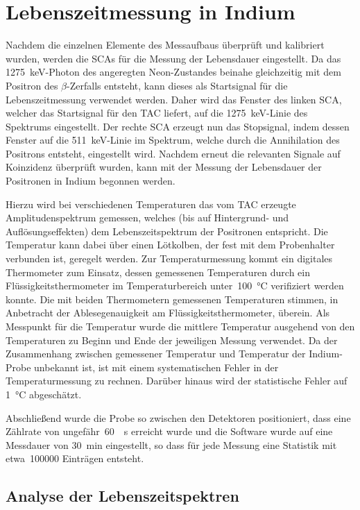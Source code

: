 \documentclass[11pt, a4paper]{article}
\numberwithin{equation}{section}
\begin{document}
\section{Lebenszeitmessung in Indium}
Nachdem die einzelnen Elemente des Messaufbaus überprüft und kalibriert wurden, werden die SCAs für die Messung der Lebensdauer eingestellt.
Da das \SI{1275}{\keV}-Photon des angeregten Neon-Zustandes beinahe gleichzeitig mit dem Positron des $\beta$-Zerfalls entsteht, kann dieses als Startsignal für die Lebenszeitmessung verwendet werden.
Daher wird das Fenster des linken SCA, welcher das Startsignal für den TAC liefert, auf die \SI{1275}{\keV}-Linie des Spektrums eingestellt.
Der rechte SCA erzeugt nun das Stopsignal, indem dessen Fenster auf die \SI{511}{\keV}-Linie im Spektrum, welche durch die Annihilation des Positrons entsteht, eingestellt wird.
Nachdem erneut die relevanten Signale auf Koinzidenz überprüft wurden, kann mit der Messung der Lebensdauer der Positronen in Indium begonnen werden.

Hierzu wird bei verschiedenen Temperaturen das vom TAC erzeugte Amplitudenspektrum gemessen, welches (bis auf Hintergrund- und Auflösungseffekten) dem Lebenszeitspektrum der Positronen entspricht.
Die Temperatur kann dabei über einen Lötkolben, der fest mit dem Probenhalter verbunden ist, geregelt werden.
Zur Temperaturmessung kommt ein digitales Thermometer zum Einsatz, dessen gemessenen Temperaturen durch ein Flüssigkeitsthermometer im Temperaturbereich unter~\SI{100}{\degreeCelsius} verifiziert werden konnte.
Die mit beiden Thermometern gemessenen Temperaturen stimmen, in Anbetracht der Ablesegenauigkeit am Flüssigkeitsthermometer, überein.
Als Messpunkt für die Temperatur wurde die mittlere Temperatur ausgehend von den Temperaturen zu Beginn und Ende der jeweiligen Messung verwendet.
Da der Zusammenhang zwischen gemessener Temperatur und Temperatur der Indium-Probe unbekannt ist, ist mit einem systematischen Fehler in der Temperaturmessung zu rechnen.
Darüber hinaus wird der statistische Fehler auf \SI{1}{\degreeCelsius} abgeschätzt.

Abschließend wurde die Probe so zwischen den Detektoren positioniert, dass eine Zählrate von ungefähr~\SI{60}{\per\second} erreicht wurde und die Software wurde auf eine Messdauer von \SI{30}{min} eingestellt, so dass für jede Messung eine Statistik mit etwa~\num{100000} Einträgen entsteht.


\subsection{Analyse der Lebenszeitspektren}
\end{document}
